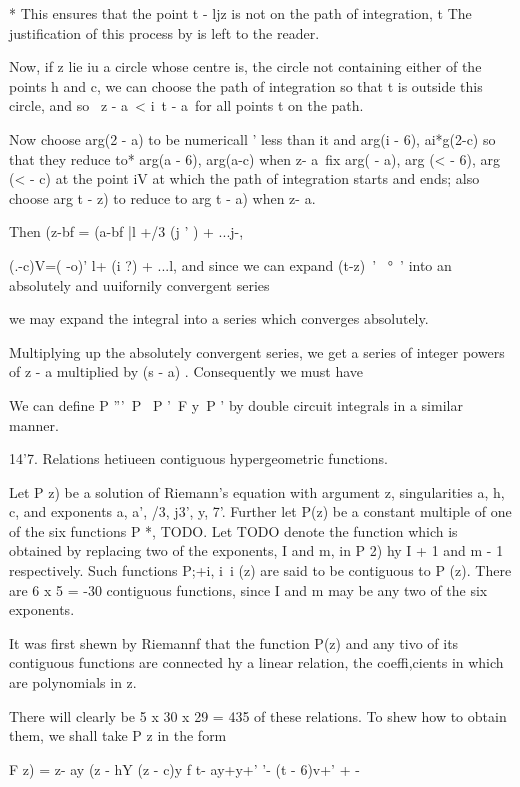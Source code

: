 * This ensures that the point t - ljz is not on the path of
integration, t The justification of this process by is left to
the reader.

%
%

Now, if z lie iu a circle whose centre is, the circle not containing
either of the points h and c, we can choose the path of integration so
that t is outside this circle, and so \ z - a\ < i\ t - a\ for all
points t on the path.

Now choose arg(2 - a) to be numericall ' less than it and arg(i - 6),
ai*g(2-c) so that they reduce to* arg(a - 6), arg(a-c) when z- a\ fix
arg( - a), arg (< - 6), arg (< - c) at the point iV at which the path
of integration starts and ends; also choose arg t - z) to reduce to
arg t - a) when z- a.

Then (z-bf = (a-bf |l +/3 (j ' ) + ...j-,

(.-c)V=( -o)' l+ (i ?) + ...l, and since we can expand (t-z)~' ~°~'
into an absolutely and uuifornily convergent series

we may expand the integral into a series which converges absolutely.

Multiplying up the absolutely convergent series, we get a series of
integer powers of z - a multiplied by (s - a) . Consequently we must
have

We can define P '''\ P \ P '\ F y\ P ' by double circuit integrals in
a similar manner.

14'7. Relations hetiueen contiguous hypergeometric functions.

Let P z) be a solution of Riemann's equation with argument z,
singularities a, h, c, and exponents a, a', /3, j3', y, 7'. Further
let P(z) be a constant multiple of one of the six functions P *,
TODO.
Let TODO denote the function
which is obtained by replacing two of the exponents, I and m, in P 2)
hy I + 1 and m - 1 respectively. Such functions P;+i, i\ i (z) are
said to be contiguous to P (z). There are 6 x 5 = -30 contiguous
functions, since I and m may be any two of the six exponents.

It was first shewn by Riemannf that the function P(z) and any tivo of
its contiguous functions are connected hy a linear relation, the
coeffi,cients in which are polynomials in z.

There will clearly be 5 x 30 x 29 = 435 of these relations. To shew
how to obtain them, we shall take P z in the form

F z) = z- ay (z - hY (z - c)y f t- ay+y+' '- (t - 6)v+' + -

